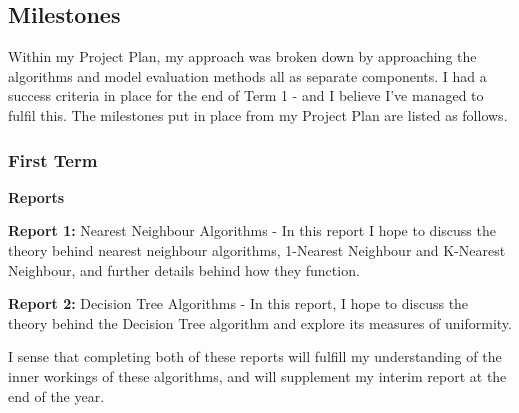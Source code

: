 \documentclass[letterpaper,10pt]{article}
\begin{document}
\newpage
\subsection{Milestones} \label{aimsobjectives}
Within my Project Plan, my approach was broken down by approaching the algorithms and model evaluation methods all as separate components. I had a success criteria in place for the end of Term 1 - and I believe I've managed to fulfil this. The milestones put in place from my Project Plan are listed as follows.

\subsubsection{First Term}
\textbf{Reports} \par
\textbf{Report 1:} Nearest Neighbour Algorithms - In this report I hope to discuss the theory behind nearest neighbour algorithms, 1-Nearest Neighbour and K-Nearest Neighbour, and further details behind how they function. \par 
\noindent \textbf{Report 2:} Decision Tree Algorithms - In this report, I hope to discuss the theory behind the Decision Tree algorithm and explore its measures of uniformity. \par
\vspace{2mm}
I sense that completing both of these reports will fulfill my understanding of the inner workings of these algorithms, and will supplement my interim report at the end of the year. \par
\end{document}
